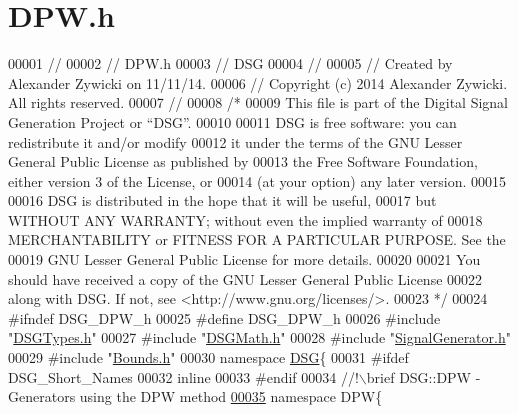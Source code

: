 \hypertarget{_d_p_w_8h_source}{\section{D\+P\+W.\+h}
\label{_d_p_w_8h_source}
}

\begin{DoxyCode}
00001 \textcolor{comment}{//}
00002 \textcolor{comment}{//  DPW.h}
00003 \textcolor{comment}{//  DSG}
00004 \textcolor{comment}{//}
00005 \textcolor{comment}{//  Created by Alexander Zywicki on 11/11/14.}
00006 \textcolor{comment}{//  Copyright (c) 2014 Alexander Zywicki. All rights reserved.}
00007 \textcolor{comment}{//}
00008 \textcolor{comment}{/*}
00009 \textcolor{comment}{ This file is part of the Digital Signal Generation Project or “DSG”.}
00010 \textcolor{comment}{}
00011 \textcolor{comment}{ DSG is free software: you can redistribute it and/or modify}
00012 \textcolor{comment}{ it under the terms of the GNU Lesser General Public License as published by}
00013 \textcolor{comment}{ the Free Software Foundation, either version 3 of the License, or}
00014 \textcolor{comment}{ (at your option) any later version.}
00015 \textcolor{comment}{}
00016 \textcolor{comment}{ DSG is distributed in the hope that it will be useful,}
00017 \textcolor{comment}{ but WITHOUT ANY WARRANTY; without even the implied warranty of}
00018 \textcolor{comment}{ MERCHANTABILITY or FITNESS FOR A PARTICULAR PURPOSE.  See the}
00019 \textcolor{comment}{ GNU Lesser General Public License for more details.}
00020 \textcolor{comment}{}
00021 \textcolor{comment}{ You should have received a copy of the GNU Lesser General Public License}
00022 \textcolor{comment}{ along with DSG.  If not, see <http://www.gnu.org/licenses/>.}
00023 \textcolor{comment}{ */}
00024 \textcolor{preprocessor}{#ifndef DSG\_DPW\_h}
00025 \textcolor{preprocessor}{#define DSG\_DPW\_h}
00026 \textcolor{preprocessor}{#include "\hyperlink{_d_s_g_types_8h}{DSGTypes.h}"}
00027 \textcolor{preprocessor}{#include "\hyperlink{_d_s_g_math_8h}{DSGMath.h}"}
00028 \textcolor{preprocessor}{#include "\hyperlink{_signal_generator_8h}{SignalGenerator.h}"}
00029 \textcolor{preprocessor}{#include "\hyperlink{_bounds_8h}{Bounds.h}"}
00030 \textcolor{keyword}{namespace }\hyperlink{namespace_d_s_g}{DSG}\{
00031 \textcolor{preprocessor}{#ifdef DSG\_Short\_Names}
00032     \textcolor{keyword}{inline}
00033 \textcolor{preprocessor}{#endif}
00034 \textcolor{comment}{    //!\(\backslash\)brief DSG::DPW - Generators using the DPW method}
\hypertarget{_d_p_w_8h_source_l00035}{}\hyperlink{namespace_d_s_g_1_1_d_p_w}{00035} \textcolor{comment}{}    \textcolor{keyword}{namespace }DPW\{\textcolor{comment}{}

\end{DoxyCode}
